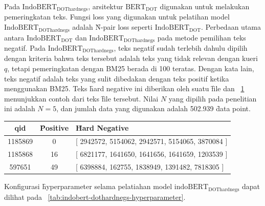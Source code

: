 Pada $\text{IndoBERT}_\text{DOThardnegs}$, arsitektur $\text{BERT}_\text{DOT}$ digunakan untuk melakukan pemeringkatan teks. Fungsi loss yang digunakan untuk pelatihan model $\text{IndoBERT}_{\text{DOThardnegs}}$ adalah \f{N-pair loss} seperti $\text{IndoBERT}_{\text{DOT}}$. Perbedaan utama antara $\text{IndoBERT}_{\text{DOT}}$ dan $\text{IndoBERT}_{\text{DOThardnegs}}$ pada metode pemilihan teks negatif. Pada $\text{IndoBERT}_{\text{DOThardnegs}}$, teks negatif sudah terlebih dahulu dipilih dengan kriteria bahwa teks tersebut adalah teks yang tidak relevan dengan kueri $q$, tetapi pemeringkatan dengan BM25 berada di 100 teratas. Dengan kata lain, teks negatif adalah teks yang sulit dibedakan dengan teks positif ketika menggunakan BM25. Teks \f{hard negative} ini diberikan oleh suatu \f{file} dan \tab~\ref{tab:hardnegsbm25} menunjukkan contoh dari teks \f{file} tersebut. Nilai $N$ yang dipilih pada penelitian ini adalah $N=5$, dan jumlah data yang digunakan adalah 502.939 \f{data point}.

\begin{table}[!ht]
    \centering
    \label{tab:hardnegsbm25}
    \begin{tabular}{|c|c|p{8cm}|}
        \hline
        qid & \f{Positive} & \f{Hard Negative}                                           \\
        \hline
        1185869 &  0  & [ 2942572, 5154062, 2942571, 5154065, 3870084 ] \\
        \hline
        1185868 &  16  & [ 6821177, 1641650, 1641656, 1641659, 1203539 ] \\
        \hline
        597651 &  49  & [ 6398884, 162755, 1838949, 1391482, 7818305 ] \\
        \hline
    \end{tabular}
\end{table}


Konfigurasi \f{hyperparameter} selama pelatiahan model $\text{indoBERT}_{\text{DOThardnegs}}$ dapat  dilihat pada \tab~\ref{tab:indobert-dothardnegs-hyperparameter}.

